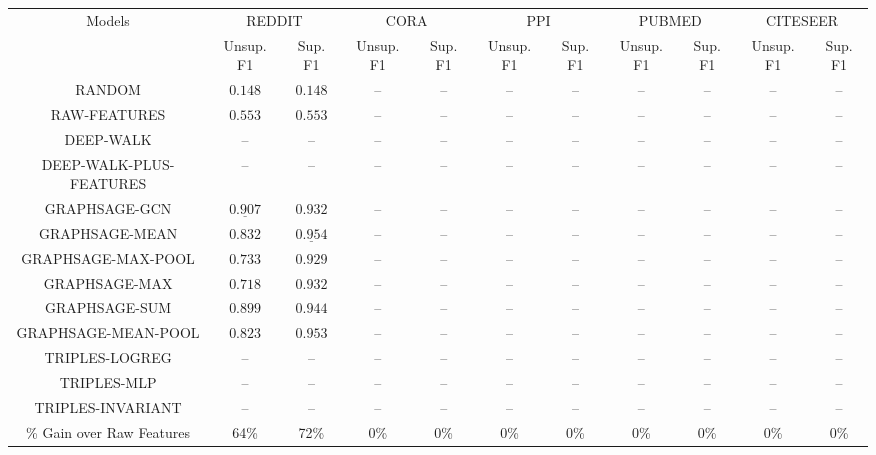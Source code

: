\begin{tabular}{ccccccccccc}
    \hline
    \multirow{2}{*}{ Models } &
    	\multicolumn{2}{c}{ REDDIT } & 	\multicolumn{2}{c}{ CORA } & 	\multicolumn{2}{c}{ PPI } & 	\multicolumn{2}{c}{ PUBMED } & 	\multicolumn{2}{c}{ CITESEER } \\

    \cline { 2 - 11 } &
         Unsup. F1 & Sup. F1 &  Unsup. F1 & Sup. F1 &  Unsup. F1 & Sup. F1 &  Unsup. F1 & Sup. F1 &  Unsup. F1 & Sup. F1  \\
    \hline
    	RANDOM & $0.148$ & $0.148$ & -- & -- & -- & -- & -- & -- & -- & -- \\
	RAW-FEATURES & $0.553$ & $0.553$ & -- & -- & -- & -- & -- & -- & -- & -- \\
	DEEP-WALK & -- & -- & -- & -- & -- & -- & -- & -- & -- & -- \\
	DEEP-WALK-PLUS-FEATURES & -- & -- & -- & -- & -- & -- & -- & -- & -- & -- \\
	GRAPHSAGE-GCN & $\underline{\mathbf{0.907}}$ & $0.932$ & -- & -- & -- & -- & -- & -- & -- & -- \\
	GRAPHSAGE-MEAN & $0.832$ & $\underline{\mathbf{0.954}}$ & -- & -- & -- & -- & -- & -- & -- & -- \\
	GRAPHSAGE-MAX-POOL & $0.733$ & $0.929$ & -- & -- & -- & -- & -- & -- & -- & -- \\
	GRAPHSAGE-MAX & $0.718$ & $0.932$ & -- & -- & -- & -- & -- & -- & -- & -- \\
	GRAPHSAGE-SUM & $0.899$ & $0.944$ & -- & -- & -- & -- & -- & -- & -- & -- \\
	GRAPHSAGE-MEAN-POOL & $0.823$ & $0.953$ & -- & -- & -- & -- & -- & -- & -- & -- \\
	TRIPLES-LOGREG & -- & -- & -- & -- & -- & -- & -- & -- & -- & -- \\
	TRIPLES-MLP & -- & -- & -- & -- & -- & -- & -- & -- & -- & -- \\
	TRIPLES-INVARIANT & -- & -- & -- & -- & -- & -- & -- & -- & -- & -- \\

    \hline
    \% Gain over Raw Features & 64\% & 72\% & 0\% & 0\% & 0\% & 0\% & 0\% & 0\% & 0\% & 0\% \\
    \hline
    \end{tabular}